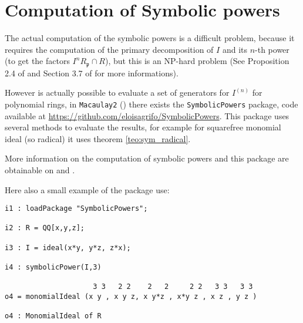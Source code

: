 \documentclass[notitlepage, a4]{book}
\theoremstyle{plain}
\theoremstyle{remark}
\theoremstyle{definition}
\newcommand{\p}{\mathfrak{p}}
\begin{document}
\section{Computation of Symbolic powers}

%

The actual computation of the symbolic powers is a difficult problem, because it requires the computation of the primary decomposition of $ I $ and its $ n $-th power (to get the factors $ I^n R_\p \cap R $), but this is an NP-hard problem (See Proposition 2.4 of \cite{Serk02} and Section 3.7 of \cite{Swa17} for more informations). 

However is actually possible to evaluate a set of generators for $ I^{(n)} $ for polynomial rings, in \verb|Macaulay2| (\cite{M2}) there exists the \verb|SymbolicPowers| package, code available at  \href{https://github.com/eloisagrifo/SymbolicPowers}{https://github.com/eloisagrifo/SymbolicPowers}. This package uses several methods to evaluate the results, for example for squarefree monomial ideal (so radical) it uses theorem \ref{teo:sym_radical}. 

More information on the computation of symbolic powers and this package are obtainable on \cite{Grifo18Symb} and \cite{Grifo17computation}. 


Here also a small example of the package use:

\begin{lstlisting}[language = Macaulay2]
i1 : loadPackage "SymbolicPowers"; 

i2 : R = QQ[x,y,z];

i3 : I = ideal(x*y, y*z, z*x);

i4 : symbolicPower(I,3)

                     3 3   2 2    2   2     2 2   3 3   3 3
o4 = monomialIdeal (x y , x y z, x y*z , x*y z , x z , y z )

o4 : MonomialIdeal of R

\end{lstlisting}
\end{document}
